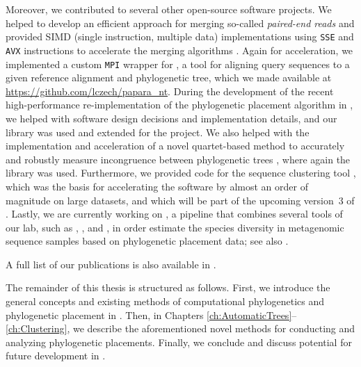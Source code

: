 Moreover, we contributed to several other open-source software projects.
We helped to develop an efficient approach for merging so-called \emph{paired-end reads}
and provided SIMD (single instruction, multiple data) implementations using \texttt{SSE} and \texttt{AVX} instructions
to accelerate the merging algorithms \cite{Flouri2017}.
Again for acceleration, we implemented a custom \texttt{\acs{MPI}} wrapper for  \cite{Berger2011a,Berger2012},
a tool for aligning query sequences to a given reference alignment and phylogenetic tree,
which we made available at \url{https://github.com/lczech/papara_nt}.
During the development of the recent high-performance re-implementation of the phylogenetic placement algorithm
in  \cite{Barbera2018}, we helped with software design decisions and implementation details,
and our  library was used and extended for the project.
We also helped with the implementation and acceleration of a novel quartet-based method to accurately and robustly
measure incongruence between phylogenetic trees \cite{Zhou2017},
where again the  library was used.
Furthermore, we provided code for the sequence clustering tool  \cite{Mahe2014,Mahe2015},
which was the basis for accelerating the software by almost an order of magnitude on large datasets,
and which will be part of the upcoming version~3 of .
Lastly, we are currently working on ,
a pipeline that combines several tools of our lab, such as
 \cite{Barbera2018},  \cite{Morel2018}, and  \cite{Kapli2017},
in order estimate the species diversity in metagenomic sequence samples based on phylogenetic placement data;
see also .

A full list of our publications is also available in .

The remainder of this thesis is structured as follows.
First, we introduce the general concepts and existing methods
of computational phylogenetics and phylogenetic placement in .
Then, in Chapters \ref{ch:AutomaticTrees}--\ref{ch:Clustering}, we describe the aforementioned novel methods
for conducting and analyzing phylogenetic placements.
Finally, we conclude and discuss potential for future development in .



